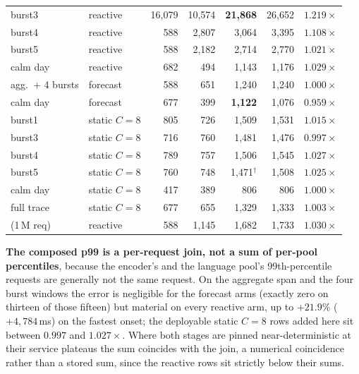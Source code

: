 \begin{table}[htbp]
\begin{tabular}{@{}llrrrrr@{}}
burst3 & reactive & 16{,}079 & 10{,}574 & \textbf{21{,}868} & 26{,}652 & $\mathbf{1.219\times}$ \\
burst4 & reactive & 588 & 2{,}807 & 3{,}064 & 3{,}395 & $1.108\times$ \\
burst5 & reactive & 588 & 2{,}182 & 2{,}714 & 2{,}770 & $1.021\times$ \\
calm day & reactive & 682 & 494 & 1{,}143 & 1{,}176 & $1.029\times$ \\
\midrule
agg.\ + 4 bursts & forecast & 588 & 651 & 1{,}240 & 1{,}240 & $1.000\times$ \\
calm day & forecast & 677 & 399 & \textbf{1{,}122} & 1{,}076 & $\mathbf{0.959\times}$ \\
\midrule
burst1 & static $C{=}8$ & 805 & 726 & 1{,}509 & 1{,}531 & $1.015\times$ \\
burst3 & static $C{=}8$ & 716 & 760 & 1{,}481 & 1{,}476 & $0.997\times$ \\
burst4 & static $C{=}8$ & 789 & 757 & 1{,}506 & 1{,}545 & $1.027\times$ \\
burst5 & static $C{=}8$ & 760 & 748 & 1{,}471$^{\dagger}$ & 1{,}508 & $1.025\times$ \\
calm day & static $C{=}8$ & 417 & 389 & 806 & 806 & $1.000\times$ \\
\midrule
full trace & static $C{=}8$ & 677 & 655 & 1{,}329 & 1{,}333 & $1.003\times$ \\
(1\,M req) & reactive & 588 & 1{,}145 & 1{,}682 & 1{,}733 & $1.030\times$ \\
\bottomrule
\end{tabular}
\end{table}

\textbf{The composed p99 is a per-request join, not a sum of per-pool
percentiles}, because the encoder's and the language pool's 99th-percentile
requests are generally not the same request. On the aggregate span and the four
burst windows the error is negligible for the forecast arms (exactly zero on
thirteen of those fifteen) but material on every reactive arm, up to
$\mathbf{+21.9\%}$ ($+4{,}784$\,\si{\milli\second}) on the fastest onset; the
deployable static $C{=}8$ rows added here sit between $0.997$ and
$1.027\times$. Where
both stages are pinned near-deterministic at their service plateaus the sum
coincides with the join, a numerical coincidence rather than a stored sum, since
the reactive rows sit strictly below their sums.

